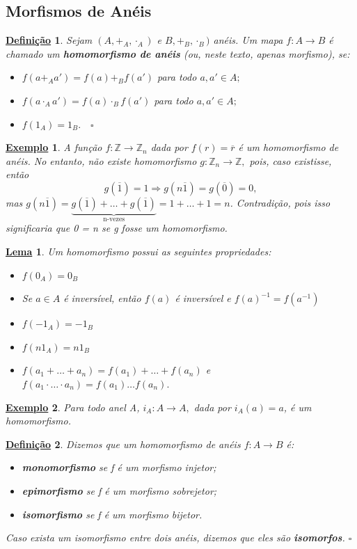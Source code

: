 \documentclass{article}
\newtheorem*{def*}{\underline{Defini\c c\~ao}}
\newtheorem*{lemma*}{\underline{Lema}}
\newtheorem{example}{\underline{Exemplo}}
\begin{document}
\subsection{Morfismos de Anéis}
\begin{def*}
  Sejam \((A, +_{A}, \cdot_{A})\) e \(B, +_{B}, \cdot_{B})\) anéis. Um mapa \(f:A\rightarrow B\) é chamado um \textbf{homomorfismo de anéis}
  (ou, neste texto, apenas morfismo), se:
  \begin{itemize}
    \item[i)] \(f(a +_{A} a') = f(a) +_{B} f(a')\) para todo \(a, a'\in A;\)
    \item[ii)] \(f(a \cdot_{A} a') = f(a)\cdot_{B}f(a')\) para todo \(a, a'\in A;\)
    \item[iii)] \(f(1_{A}) = 1_{B}.\quad\square\)
  \end{itemize}
\end{def*}
\begin{example}
  A função \(f:\mathbb{Z}\rightarrow \mathbb{Z}_{n}\) dada por \(f(r) = \overline{r}\) é um homomorfismo de anéis. No entanto, não existe homomorfismo
  \(g:\mathbb{Z}_{n}\rightarrow \mathbb{Z},\) pois, caso existisse, então 
  \[
    g(\overline{1}) = 1 \Rightarrow g(n\overline{1}) = g(\overline{0}) = 0,
  \]
  mas \(g(n\overline{1}) = \underbrace{g(\overline{1}) + \dotsc + g(\overline{1})}_{\text{n-vezes}} = 1 + \dotsc + 1 = n\). Contradição, pois isso
  significaria que 0 = n se g fosse um homomorfismo.
\end{example}
\begin{lemma*}
  Um homomorfismo possui as seguintes propriedades:
  \begin{itemize}
    \item[1)] \(f(0_{A}) = 0_{B}\)
    \item[2)] Se \(a\in A\) é inversível, então \(f(a)\) é inversível e \(f(a)^{-1} = f(a^{-1})\)
    \item[3)] \(f(-1_{A}) = -1_{B}\)
    \item[4)] \(f(n1_{A}) = n1_{B}\)
    \item[5)] \(f(a_{1} + \dotsc + a_{n}) = f(a_{1})+\dotsc +f(a_{n})\) e \(f(a_{1}\cdot \dotsc \cdot a_{n}) = f(a_{1})\dotsc f(a_{n}).\)
  \end{itemize}
\end{lemma*}
\begin{example}
  Para todo anel A, \(i_{A}:A\rightarrow A,\) dada por \(i_{A}(a) = a\), é um homomorfismo.
\end{example}
\begin{def*}
  Dizemos que um homomorfismo de anéis \(f:A\rightarrow B\) é:
  \begin{itemize}
    \item[1)] \textbf{monomorfismo} se f é um morfismo injetor;
    \item[2)] \textbf{epimorfismo} se f é um morfismo sobrejetor;
    \item[3)] \textbf{isomorfismo} se f é um morfismo bijetor.
  \end{itemize}
  Caso exista um isomorfismo entre dois anéis, dizemos que eles são \textbf{isomorfos}. \(\square\)
\end{def*}
\end{document}
